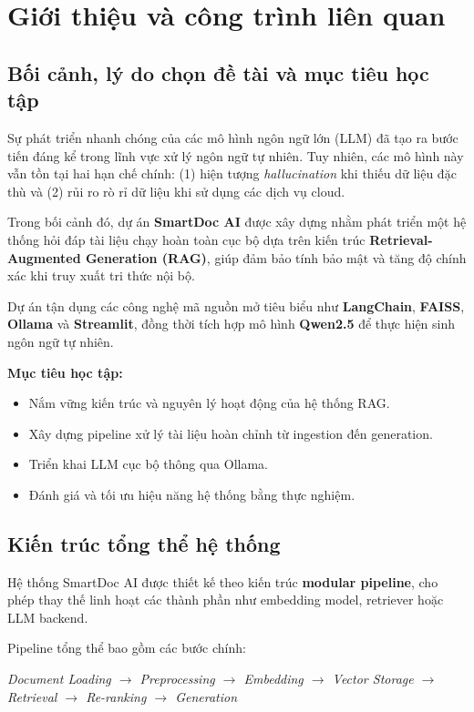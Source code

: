 ﻿\documentclass[10pt, conference, a4paper, compsocconf]{IEEEtran}
\begin{document}
\section{Giới thiệu và công trình liên quan}

\subsection{Bối cảnh, lý do chọn đề tài và mục tiêu học tập}

Sự phát triển nhanh chóng của các mô hình ngôn ngữ lớn (LLM) đã tạo ra bước tiến đáng kể trong lĩnh vực xử lý ngôn ngữ tự nhiên. Tuy nhiên, các mô hình này vẫn tồn tại hai hạn chế chính: (1) hiện tượng \textit{hallucination} khi thiếu dữ liệu đặc thù và (2) rủi ro rò rỉ dữ liệu khi sử dụng các dịch vụ cloud.

Trong bối cảnh đó, dự án \textbf{SmartDoc AI} được xây dựng nhằm phát triển một hệ thống hỏi đáp tài liệu chạy hoàn toàn cục bộ dựa trên kiến trúc \textbf{Retrieval-Augmented Generation (RAG)}, giúp đảm bảo tính bảo mật và tăng độ chính xác khi truy xuất tri thức nội bộ.

Dự án tận dụng các công nghệ mã nguồn mở tiêu biểu như \textbf{LangChain}, \textbf{FAISS}, \textbf{Ollama} và \textbf{Streamlit}, đồng thời tích hợp mô hình \textbf{Qwen2.5} để thực hiện sinh ngôn ngữ tự nhiên.

\textbf{Mục tiêu học tập:}
\begin{itemize}
    \item Nắm vững kiến trúc và nguyên lý hoạt động của hệ thống RAG.
    \item Xây dựng pipeline xử lý tài liệu hoàn chỉnh từ ingestion đến generation.
    \item Triển khai LLM cục bộ thông qua Ollama.
    \item Đánh giá và tối ưu hiệu năng hệ thống bằng thực nghiệm.
\end{itemize}

\subsection{Kiến trúc tổng thể hệ thống}

Hệ thống SmartDoc AI được thiết kế theo kiến trúc \textbf{modular pipeline}, cho phép thay thế linh hoạt các thành phần như embedding model, retriever hoặc LLM backend.

Pipeline tổng thể bao gồm các bước chính:
\begin{center}
\textit{Document Loading $\rightarrow$ Preprocessing $\rightarrow$ Embedding $\rightarrow$ Vector Storage $\rightarrow$ Retrieval $\rightarrow$ Re-ranking $\rightarrow$ Generation}
\end{center}
\end{document}
